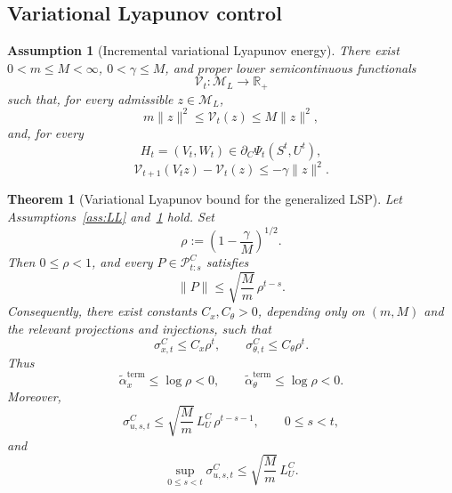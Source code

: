 \documentclass{article}
\newtheorem{assumption}{Assumption}
\newtheorem{theorem}{Theorem}[section]
\numberwithin{equation}{section}
\begin{document}
\subsection{Variational Lyapunov control}
\label{subsec:variational-lyapunov-control}

\begin{assumption}[Incremental variational Lyapunov energy]
\label{ass:var-energy-main}
There exist \(0<m\le M<\infty\), \(0<\gamma\le M\), and proper lower
semicontinuous functionals
\[
\mathcal{V}_t:\mathcal{M}_L\to\mathbb{R}_+
\]
such that, for every admissible \(z\in\mathcal{M}_L\),
\[
m\|z\|^2
\le
\mathcal{V}_t(z)
\le
M\|z\|^2 ,
\]
and, for every
\[
H_t=(V_t,W_t)\in\partial_C\Psi_t(S^t,U^t),
\]
\[
\mathcal{V}_{t+1}(V_tz)-\mathcal{V}_t(z)
\le
-\gamma\|z\|^2 .
\]
\end{assumption}

\begin{theorem}[Variational Lyapunov bound for the generalized LSP]
\label{thm:fundamental-variational-main}
Let Assumptions~\ref{ass:LL} and~\ref{ass:var-energy-main} hold. Set
\[
\rho:=\left(1-\frac{\gamma}{M}\right)^{1/2}.
\]
Then \(0\le\rho<1\), and every \(P\in\mathcal{P}_{t:s}^C\) satisfies
\[
\|P\|
\le
\sqrt{\frac{M}{m}}\,\rho^{t-s}.
\]
Consequently, there exist constants \(C_x,C_\theta>0\), depending only on
\((m,M)\) and the relevant projections and injections, such that
\[
\sigma_{x,t}^C\le C_x\rho^t,
\qquad
\sigma_{\theta,t}^C\le C_\theta\rho^t .
\]
Thus
\[
\tilde\alpha_x^{\mathrm{term}}\le\log\rho<0,
\qquad
\tilde\alpha_\theta^{\mathrm{term}}\le\log\rho<0 .
\]
Moreover,
\[
\sigma_{u,s,t}^C
\le
\sqrt{\frac{M}{m}}\,L_U^C\,\rho^{t-s-1},
\qquad
0\le s<t,
\]
and
\[
\sup_{0\le s<t}\sigma_{u,s,t}^C
\le
\sqrt{\frac{M}{m}}\,L_U^C .
\]
\end{theorem}
\end{document}
